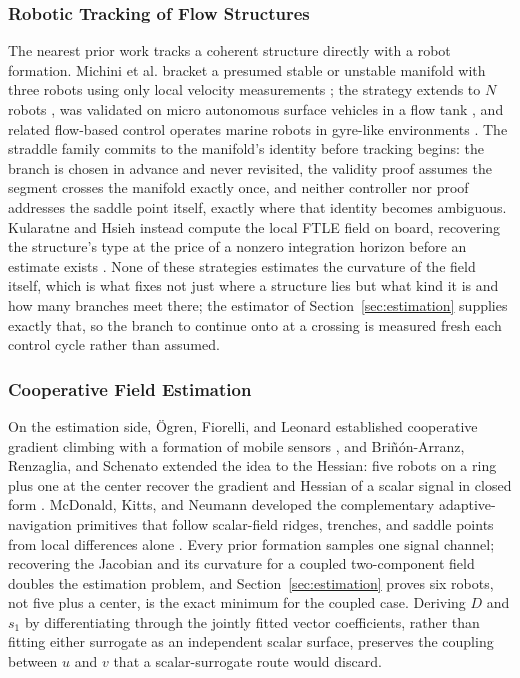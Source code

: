 \documentclass[lettersize,journal]{IEEEtran}
\begin{document}
\subsubsection{Robotic Tracking of Flow Structures}
The nearest prior work tracks a coherent structure directly with a
robot formation. Michini et al. bracket a presumed stable or unstable
manifold with three robots using only local velocity measurements
\cite{9}; the strategy extends to $N$ robots \cite{10}, was validated
on micro autonomous surface vehicles in a flow tank \cite{11}, and
related flow-based control operates marine robots in gyre-like
environments \cite{12}. The straddle family commits to the manifold's
identity before tracking begins: the branch is chosen in advance and
never revisited, the validity proof assumes the segment crosses the
manifold exactly once, and neither controller nor proof addresses the
saddle point itself, exactly where that identity becomes ambiguous.
Kularatne and Hsieh instead compute the local FTLE field on board,
recovering the structure's type at the price of a nonzero integration
horizon before an estimate exists \cite{13}. None of these strategies
estimates the curvature of the field itself, which is what fixes not
just where a structure lies but what kind it is and how many branches
meet there; the estimator of Section~\ref{sec:estimation} supplies
exactly that, so the branch to continue onto at a crossing is measured
fresh each control cycle rather than assumed.

\subsubsection{Cooperative Field Estimation}
On the estimation side, \"{O}gren, Fiorelli, and Leonard established
cooperative gradient climbing with a formation of mobile sensors
\cite{26}, and Bri\~{n}\'{o}n-Arranz, Renzaglia, and Schenato extended
the idea to the Hessian: five robots on a ring plus one at the center
recover the gradient and Hessian of a scalar signal in closed form
\cite{15}. McDonald, Kitts, and Neumann developed the complementary
adaptive-navigation primitives that follow scalar-field ridges,
trenches, and saddle points from local differences alone
\cite{27,28,29}. Every prior formation samples one signal channel;
recovering the Jacobian and its curvature for a coupled two-component
field doubles the estimation problem, and Section~\ref{sec:estimation}
proves six robots, not five plus a center, is the exact minimum for the
coupled case. Deriving $D$ and $s_1$ by differentiating through the
jointly fitted vector coefficients, rather than fitting either
surrogate as an independent scalar surface, preserves the coupling
between $u$ and $v$ that a scalar-surrogate route would discard.
\end{document}

